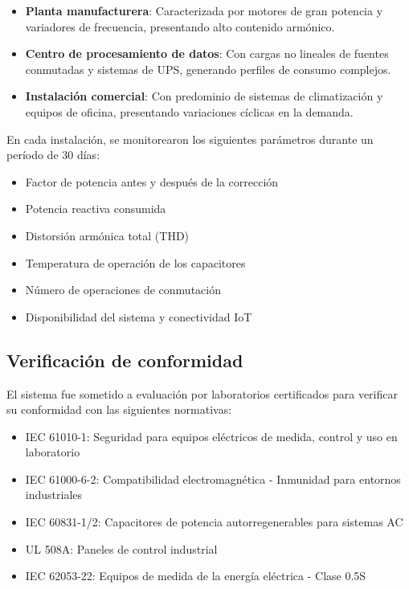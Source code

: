 \documentclass{report}          %
\begin{document}
                \begin{itemize}
                    \item \textbf{Planta manufacturera}: Caracterizada por motores de gran potencia y variadores de frecuencia, presentando alto contenido armónico.
                    
                    \item \textbf{Centro de procesamiento de datos}: Con cargas no lineales de fuentes conmutadas y sistemas de UPS, generando perfiles de consumo complejos.
                    
                    \item \textbf{Instalación comercial}: Con predominio de sistemas de climatización y equipos de oficina, presentando variaciones cíclicas en la demanda.
                \end{itemize}
                
                En cada instalación, se monitorearon los siguientes parámetros durante un período de 30 días:
                
                \begin{itemize}
                    \item Factor de potencia antes y después de la corrección
                    \item Potencia reactiva consumida
                    \item Distorsión armónica total (THD)
                    \item Temperatura de operación de los capacitores
                    \item Número de operaciones de conmutación
                    \item Disponibilidad del sistema y conectividad IoT
                \end{itemize}
            
            \subsection{Verificación de conformidad}
                El sistema fue sometido a evaluación por laboratorios certificados para verificar su conformidad con las siguientes normativas:

                \begin{itemize}
                    \item IEC 61010-1: Seguridad para equipos eléctricos de medida, control y uso en laboratorio
                    \item IEC 61000-6-2: Compatibilidad electromagnética - Inmunidad para entornos industriales
                    \item IEC 60831-1/2: Capacitores de potencia autorregenerables para sistemas AC
                    \item UL 508A: Paneles de control industrial
                    \item IEC 62053-22: Equipos de medida de la energía eléctrica - Clase 0.5S
                \end{itemize}
\end{document}
